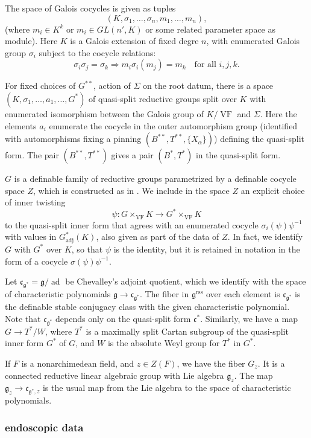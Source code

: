 \documentclass[12pt]{amsart}
\newcommand{\op}[1]{\operatorname{#1}}
\def\VF{{\op{VF}}}
\newcommand{\fg}{\mathfrak{g}}
\newcommand{\fc}{\mathfrak{c}}
\newcommand{\reg}{\mathrm{rss}}
\theoremstyle{plain}
\theoremstyle{definition}
\begin{document}
The space of Galois cocycles is given as tuples
\[
(K,\sigma_1,\ldots,\sigma_n,m_1,\ldots,m_n),
\]
(where $m_i \in K^k$ or $m_i\in GL(n',K)$ or some related parameter
space as module).  Here $K$ is a Galois extension of fixed degre $n$, with
enumerated Galois group $\sigma_i$ subject to the cocycle relations:
\[
\sigma_i \sigma_j 
  = \sigma_k \Longrightarrow m_i \sigma_i(m_j) 
  = m_k\quad\text{for all } i,j,k.
\]

For fixed choices of $G^{**}$, action of $\Sigma$ on the root datum,
there is a space $(K,\sigma_1,\ldots,a_1,\ldots,G^*)$ of
quasi-split reductive groups split over $K$ with enumerated
isomorphism between the Galois group of $K/\VF$ and $\Sigma$.  Here
the elements $a_i$ enumerate the cocycle in the outer
automorphism group (identified with automorphisms fixing a pinning
$(B^{**},T^{**},\{X_\alpha\})$) defining the quasi-split form.  The
pair $(B^{**},T^{**})$ gives a pair $(B^*,T^*)$ in the quasi-split
form.

$G$ is a definable family of reductive groups parametrized by a
definable cocycle space $Z$, which is constructed as in \cite{CGH2}.  We
include in the space $Z$ an explicit choice of inner twisting 
\[
\psi:G
\times_\VF K \to G^*\times_\VF K
\] to the quasi-split inner form that agrees with an enumerated
cocycle $\sigma_i(\psi) \psi^{-1}$ with values in $G^*_{\op{adj}}(K)$, also
given as part of the data of $Z$.  In fact, we identify $G$ with $G^*$
over $K$, so that $\psi$ is the identity, but it is retained in
notation in the form of a cocycle $\sigma(\psi)\psi^{-1}$.  

Let $\fc_{\fg^{*}} = \fg/\op{ad}$ be Chevalley's adjoint quotient, which
we identify with the space of characteristic polynomials $\fg\to
\fc_{\fg^{*}}$.  The fiber in $\fg^\reg$ over each element is
$\fc_{\fg^{*}}$ is the definable stable conjugacy class with the given
characteristic polynomial.  Note that $\fc_{\fg^{*}}$ depends only on
the quasi-split form $\fc^*$. Similarly, we have a map $G\to T^*/W$,
where $T^*$ is a maximally split Cartan subgroup of the quasi-split
inner form $G^*$ of $G$, and $W$ is the absolute Weyl group for $T^*$
in $G^*$.

If $F$ is a nonarchimedean field, and $z\in Z(F)$, we have the fiber
$G_z$.  It is a connected reductive linear algebraic group with Lie
algebra $\fg_z$.  The map $\fg_z\to \fc_{\fg^{*},z}$ is the usual map
from the Lie algebra to the space of characteristic polynomials.

\subsubsection{endoscopic data}
\end{document}
